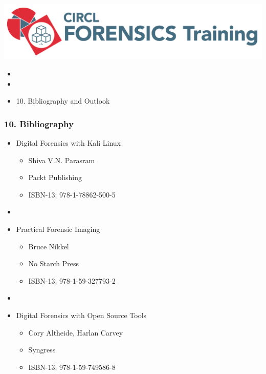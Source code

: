 %
%



\begin{frame}
    \includegraphics[scale=0.3]{images/logo-circl-Forensics.png}
    \begin{itemize}
        \item[]
        \item[]
        \item[] 10. Bibliography and Outlook
    \end{itemize}
\end{frame}


\begin{frame}[fragile]
  \frametitle{10. Bibliography}
  \begin{itemize}
      \item Digital Forensics with Kali Linux
        \begin{itemize}
            \item[] Shiva V.N. Parasram
            \item[] Packt Publishing
            \item[] ISBN-13: 978-1-78862-500-5
        \end{itemize}
      \item[]
      \item Practical Forensic Imaging
        \begin{itemize}
            \item[] Bruce Nikkel
            \item[] No Starch Press
            \item[] ISBN-13: 978-1-59-327793-2
        \end{itemize}
      \item[]
      \item Digital Forensics with Open Source Tools
        \begin{itemize}
            \item[] Cory Altheide, Harlan Carvey
            \item[] Syngress
            \item[] ISBN-13: 978-1-59-749586-8
        \end{itemize}
  \end{itemize}
\end{frame}


